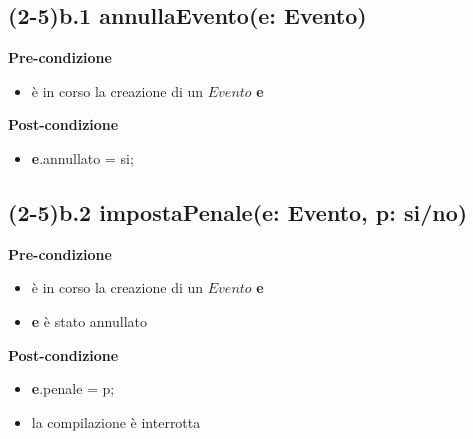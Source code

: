 \documentclass[12pt]{extarticle}
\begin{document}
\subsection*{(2-5)b.1 annullaEvento(e: Evento)}

\textbf{Pre-condizione}
\begin{itemize}
  \item è in corso la creazione di un $Evento$ \textbf{e}
\end{itemize}
\textbf{Post-condizione}
\begin{itemize}
  \item \textbf{e}.annullato = si;
\end{itemize}  


\subsection*{(2-5)b.2 impostaPenale(e: Evento, p: si/no)}
\textbf{Pre-condizione}
\begin{itemize}
  \item è in corso la creazione di un $Evento$ \textbf{e}
  \item \textbf{e} è stato annullato
\end{itemize}
\textbf{Post-condizione}
\begin{itemize}
  \item \textbf{e}.penale = p;
  \item la compilazione è interrotta
\end{itemize}  
\end{document}
